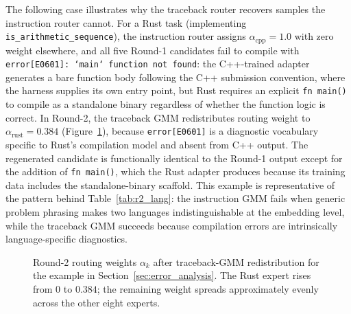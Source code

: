 The following case illustrates why the traceback router recovers samples the instruction router cannot. For a Rust task (implementing \texttt{is\_arithmetic\_sequence}), the instruction router assigns $\alpha_{\text{cpp}}=1.0$ with zero weight elsewhere, and all five Round-1 candidates fail to compile with \texttt{error[E0601]: `main` function not found}: the C++-trained adapter generates a bare function body following the C++ submission convention, where the harness supplies its own entry point, but Rust requires an explicit \texttt{fn main()} to compile as a standalone binary regardless of whether the function logic is correct. In Round-2, the traceback GMM redistributes routing weight to $\alpha_{\text{rust}}=0.384$ (Figure~\ref{fig:case_routing}), because \texttt{error[E0601]} is a diagnostic vocabulary specific to Rust's compilation model and absent from C++ output. The regenerated candidate is functionally identical to the Round-1 output except for the addition of \texttt{fn main()}, which the Rust adapter produces because its training data includes the standalone-binary scaffold. This example is representative of the pattern behind Table~\ref{tab:r2_lang}: the instruction GMM fails when generic problem phrasing makes two languages indistinguishable at the embedding level, while the traceback GMM succeeds because compilation errors are intrinsically language-specific diagnostics.

\begin{figure}[t]
\centering
{}
\caption{Round-2 routing weights $\alpha_k$ after traceback-GMM redistribution for the example in Section~\ref{sec:error_analysis}. The Rust expert rises from $0$ to $0.384$; the remaining weight spreads approximately evenly across the other eight experts.}
\label{fig:case_routing}
\end{figure}

